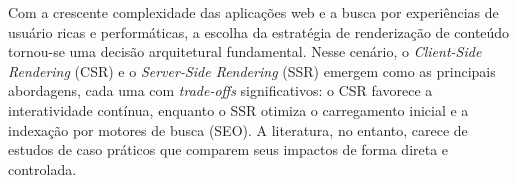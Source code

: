 \begin{resumo}







Com a crescente complexidade das aplicações web e a busca por experiências de usuário ricas e performáticas, a escolha da estratégia de renderização de conteúdo tornou-se uma decisão arquitetural fundamental. Nesse cenário, o \textit{Client-Side Rendering} (CSR) e o \textit{Server-Side Rendering} (SSR) emergem como as principais abordagens, cada uma com \textit{trade-offs} significativos: o CSR favorece a interatividade contínua, enquanto o SSR otimiza o carregamento inicial e a indexação por motores de busca (SEO). A literatura, no entanto, carece de estudos de caso práticos que comparem seus impactos de forma direta e controlada.


\end{resumo}
